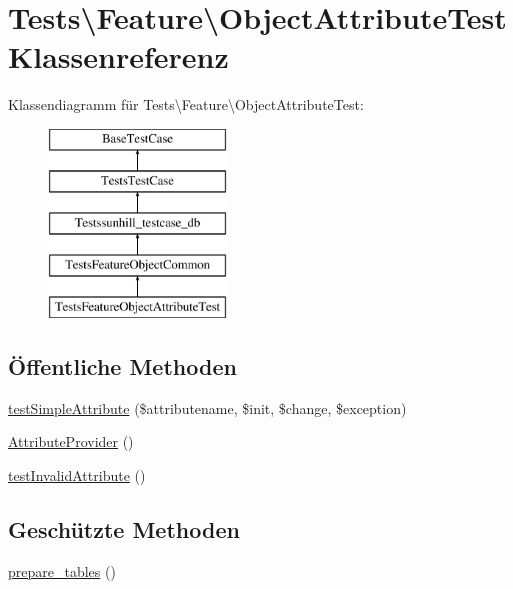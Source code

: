 \hypertarget{classTests_1_1Feature_1_1ObjectAttributeTest}{}\section{Tests\textbackslash{}Feature\textbackslash{}Object\+Attribute\+Test Klassenreferenz}
\label{classTests_1_1Feature_1_1ObjectAttributeTest}
Klassendiagramm für Tests\textbackslash{}Feature\textbackslash{}Object\+Attribute\+Test\+:\begin{figure}[H]
\begin{center}
\leavevmode
\includegraphics[height=5.000000cm]{d7/dc3/classTests_1_1Feature_1_1ObjectAttributeTest}
\end{center}
\end{figure}
\subsection*{Öffentliche Methoden}
\begin{DoxyCompactItemize}
\item 
\hyperlink{classTests_1_1Feature_1_1ObjectAttributeTest_ae54342bc39c1d3ebaa90b513cf707568}{test\+Simple\+Attribute} (\$attributename, \$init, \$change, \$exception)
\item 
\hyperlink{classTests_1_1Feature_1_1ObjectAttributeTest_a3b4b59c3ae9c730639d23f81f86ae1f5}{Attribute\+Provider} ()
\item 
\hyperlink{classTests_1_1Feature_1_1ObjectAttributeTest_abfa25e0167ad98b8e490aae304df29ce}{test\+Invalid\+Attribute} ()
\end{DoxyCompactItemize}
\subsection*{Geschützte Methoden}
\begin{DoxyCompactItemize}
\item 
\hyperlink{classTests_1_1Feature_1_1ObjectAttributeTest_ab3ca360d9f63ad9cdc630b2c0f5049d9}{prepare\+\_\+tables} ()
\end{DoxyCompactItemize}
